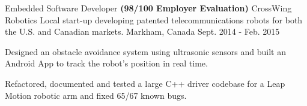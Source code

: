 \begin{cventries}
  \cventry
    {Embedded Software Developer \tiny\textbf{(98/100 Employer Evaluation)}} %
    {CrossWing Robotics \href{http://www.crosswing.com/}{\faLink\acvHeaderIconSep}
    \tiny Local start-up developing patented telecommunications robots for both the U.S. and Canadian markets.} %
    {Markham, Canada} %
    {Sept. 2014 - Feb. 2015} %
    {
      \begin{cvitems} %
        \item {Designed an obstacle avoidance system using ultrasonic sensors and built an Android App to track the robot's position in real time.}
        \item {Refactored, documented and tested a large C++ driver codebase for a Leap Motion robotic arm and fixed 65/67 known bugs.}
      \end{cvitems}
    }

\end{cventries}

